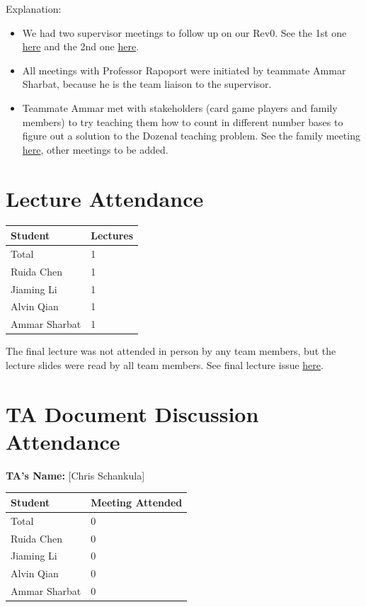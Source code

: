 \documentclass{article}
\begin{document}
Explanation:
\begin{itemize}
    \item We had two supervisor meetings to follow up on our Rev0. See the 1st one \href{https://github.com/The-Crazy-Four-Games/Crazy_1-0s_Game/issues/257}{here} and the 2nd one \href{https://github.com/The-Crazy-Four-Games/Crazy_1-0s_Game/issues/263}{here}.
    \item All meetings with Professor Rapoport were initiated by teammate Ammar Sharbat, because he is the team liaison to the supervisor.
    \item Teammate Ammar met with stakeholders (card game players and family members) to try teaching them how to count in different number bases to figure out a solution to the Dozenal teaching problem. See the family meeting \href{https://github.com/The-Crazy-Four-Games/Crazy_1-0s_Game/issues/285}{here}, other meetings to be added.
\end{itemize}

\section{Lecture Attendance}

\begin{table}[H]
\centering
\begin{tabular}{ll}
\toprule
\textbf{Student} & \textbf{Lectures}\\
\midrule
Total & 1 \\
Ruida Chen & 1 \\
Jiaming Li & 1 \\
Alvin Qian & 1 \\
Ammar Sharbat & 1 \\
\bottomrule
\end{tabular}
\end{table}

The final lecture was not attended in person by any team members, but the lecture slides were read by all team members. See final lecture issue \href{https://github.com/The-Crazy-Four-Games/Crazy_1-0s_Game/issues/233}{here}.\\

\section{TA Document Discussion Attendance}

\noindent \textbf{TA's Name: } [Chris Schankula]

\begin{table}[H]
\centering
\begin{tabular}{ll}
\toprule
\textbf{Student} & \textbf{Meeting Attended}\\
\midrule
Total & 0\\
Ruida Chen & 0 \\
Jiaming Li & 0 \\
Alvin Qian & 0 \\
Ammar Sharbat & 0 \\
\bottomrule
\end{tabular}
\end{table}
\end{document}
